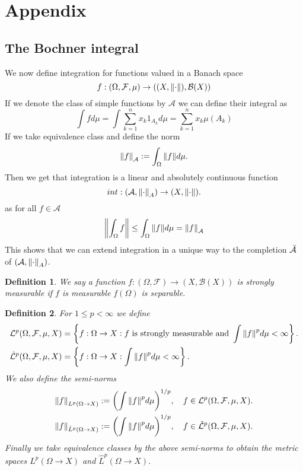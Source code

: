 \documentclass[12pt]{article}
\newtheorem{definition}{Definition}
\begin{document}
\section{Appendix}
\subsection{The Bochner integral}
We now define integration for functions valued in a Banach space \begin{equation*}
	f:(\Omega,\mathcal{F},\mu)\to ((X,\norm{\cdot}),\mathcal{B}(X))
\end{equation*}
If we denote the class of simple functions by $\mathcal{A}$ we can define their integral as
\begin{equation*}
	\int f d\mu=\int \sum_{k=1}^n x_k 1_{A_k} d\mu=\sum_{k=1}^n x_k\mu({A_k})
\end{equation*}
If we take equivalence class and define the norm
\begin{equation*}
	\norm{f}_\mathcal{A}:=\int_\Omega \norm{f} d\mu.
\end{equation*}
Then we get that integration is a linear and absolutely continuous function
\begin{equation*}
	int: \qty(\mathcal{A},\norm{\cdot}_A)\to (X,\norm{\cdot}).
\end{equation*}
as for all $f\in\mathcal{A}$
\begin{equation*}
	\norm{\int_\Omega f}\leq\int_\Omega \norm{f} d\mu=\norm{f}_\mathcal{A}
\end{equation*}
This shows that we can extend integration in a unique way to the completion $\Bar{\mathcal{A}}$ of $\qty(\mathcal{A},\norm{\cdot}_A)$.
\begin{definition}
	We say a function $f:(\Omega,\mathcal{F})\to (X,\mathcal{B}(X))$ is strongly measurable if $f$ is measurable $f(\Omega)$ is separable.
\end{definition}
\begin{definition}
	For $1\leq p<\infty$ we define
	\begin{align*}
		\mathcal{L}^p(\Omega,\mathcal{F},\mu,X)       & =\left\{f:\Omega\to X: f \text{ is strongly measurable and } \int \norm{f}^p d\mu<\infty\right\}. \\
		\hat{\mathcal{L}}^p(\Omega,\mathcal{F},\mu,X) & =\left\{f:\Omega\to X: \int \norm{f}^p d\mu<\infty\right\}.
	\end{align*}
	We also define the semi-norms
	\begin{align*}
		\norm{f}_{L^p(\Omega\to X)}       & :=\qty(\int \norm{f}^p d\mu)^{1/p},\quad f\in\mathcal{L}^p(\Omega,\mathcal{F},\mu,X).       \\
		\norm{f}_{\hat{L}^p(\Omega\to X)} & :=\qty(\int \norm{f}^p d\mu)^{1/p},\quad f\in\hat{\mathcal{L}}^p(\Omega,\mathcal{F},\mu,X).
	\end{align*}
	Finally we take equivalence classes by the above semi-norms to obtain the metric spaces $L^p(\Omega\to X)$ and $\hat{L}^p(\Omega\to X).$
\end{definition}
\end{document}
